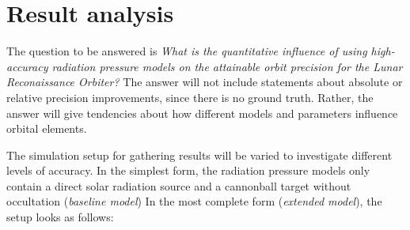 \documentclass[parskip=full,DIV=15]{scrartcl}
\begin{document}
\section{Result analysis}\label{sec:result-analysis}
The question to be answered is \textit{What is the quantitative influence of using high-accuracy radiation pressure models on the attainable orbit precision for the Lunar Reconaissance Orbiter?} The answer will not include statements about absolute or relative precision improvements, since there is no ground truth. Rather, the answer will give tendencies about how different models and parameters influence orbital elements.

The simulation setup for gathering results will be varied to investigate different levels of accuracy. In the simplest form, the radiation pressure models only contain a direct solar radiation source and a cannonball target without occultation (\emph{baseline model}) In the most complete form (\emph{extended model}), the setup looks as follows:
\end{document}
